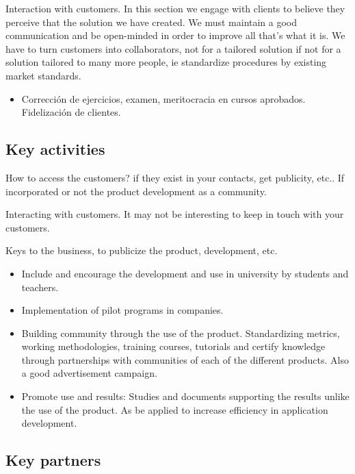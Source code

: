 \documentclass[11pt]{scrartcl}
\begin{document}
\par Interaction with customers. In this section we engage with clients to believe they perceive that the solution we have created. We must maintain a good communication and be open-minded in order to improve all that's what it is. We have to turn customers into collaborators, not for a tailored solution if not for a solution tailored to many more people, ie standardize procedures by existing market standards.

\begin{itemize}
    \item Corrección de ejercicios, examen, meritocracia en cursos aprobados. Fidelización de clientes.
\end{itemize}

\subsection{Key activities}

\par How to access the customers? if they exist in your contacts, get publicity, etc.. If incorporated or not the product development as a community.

\par Interacting with customers. It may not be interesting to keep in touch with your customers.

\par Keys to the business, to publicize the product, development, etc.
\begin{itemize}
    \item Include and encourage the development and use in university by students and teachers.
    \item Implementation of pilot programs in companies.
    \item Building community through the use of the product. Standardizing metrics, working methodologies, training courses, tutorials and certify knowledge through partnerships with communities of each of the different products. Also a good advertisement campaign.
    \item Promote use and results: Studies and documents supporting the results unlike the use of the product. As be applied to increase efficiency in application development.
\end{itemize}

\subsection{Key partners}
\end{document}
